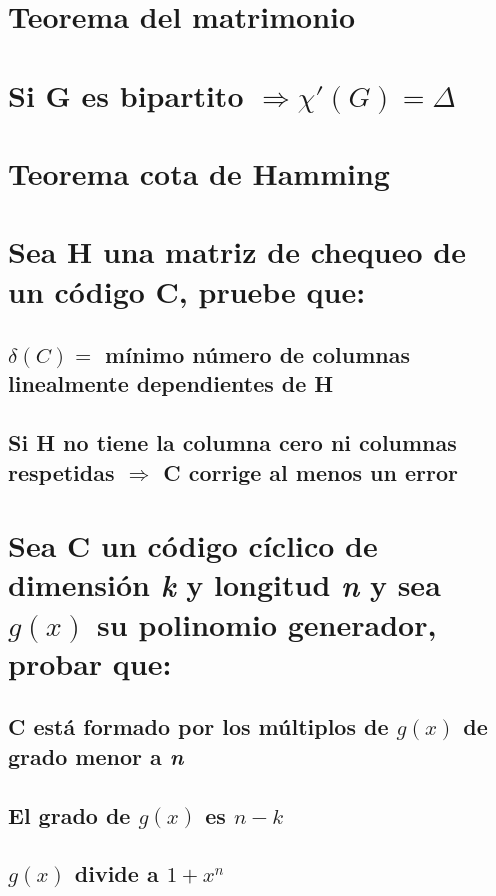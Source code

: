 \documentclass[12pt,a4paper]{report}
\begin{document}
	
	\section{Teorema del matrimonio}
	
	
	\section{Si G es bipartito $\Rightarrow \chi '(G) = \Delta $}

	
	\section{Teorema cota de Hamming}
	
	
	\section{Sea H una matriz de chequeo de un código C, pruebe que:}
	
		\subsection{$\delta (C) =$ mínimo número de columnas linealmente dependientes de H}
		
		\subsection{Si H no tiene la columna cero ni columnas respetidas $\Rightarrow$ C corrige al menos un error}


	\section{Sea C un código cíclico de dimensión \textit{k} y longitud \textit{n} y sea $g(x)$ su polinomio generador, probar que:}
	
		\subsection{C está formado por los múltiplos de $g(x)$ de grado menor a \textit{n}}
		
		\subsection{El grado de $g(x)$ es $n-k$}
		
		\subsection{$g(x)$ divide a $1+x^{n}$}
		
\end{document}
